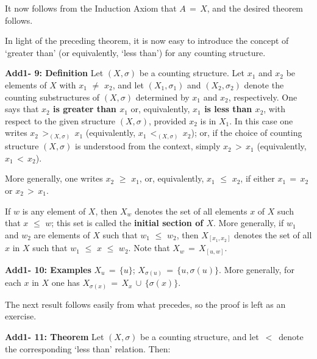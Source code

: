         It now follows from the Induction Axiom that $A \,=\, X$, and the desired theorem follows.

\V
\V

        In light of the preceding theorem, it is now easy to introduce the concept of `greater than' (or equivalently, `less than') for any counting structure.

\V

        {\bf Add1- 9: Definition} Let $(X,{\sigma})$ be a counting structure. Let $x_{1}$ and $x_{2}$ be elements of $X$ with $x_{1} \,\,{\neq}\,\, x_{2}$,
    and let $(X_{1},{\sigma}_{1})$ and $(X_{2},{\sigma}_{2})$ denote the counting substructures of $(X,{\sigma})$ determined by $x_{1}$ and $x_{2}$, respectively.
    One says that {\bf $x_{2}$ is greater than $x_{1}$} or, equivalently, {\bf $x_{1}$ is less than $x_{2}$}, with respect to the given structure $(X,{\sigma})$, provided $x_{2}$ is in $X_{1}$.
    In this case one writes $x_{2}\,>_{(X,{\sigma})}\,x_{1}$ (equivalently, $x_{1}\,<_{(X,{\sigma})}\,x_{2}$);
    or, if the choice of counting structure $(X,{\sigma})$ is understood from the context, simply $x_{2}\,>\,x_{1}$ (equivalently, $x_{1}\,<\,x_{2}$).

        More generally, one writes $x_{2}\,\,{\geq}\,\,x_{1}$, or, equivalently, $x_{1}\,\,{\leq}\,\,x_{2}$, if either $x_{1} \,=\, x_{2}$ or $x_{2}\,>\,x_{1}$.

        If $w$ is any element of $X$, then $X_{w}$ denotes the set of all elements $x$ of $X$ such that $x\,\,{\leq}\,\,w$;
    this set is called the {\bf initial section of $X$}.
    More generally, if $w_{1}$ and $w_{2}$ are elements of $X$ such that $w_{1}\,\,{\leq}\,\,w_{2}$,
    then $X_{[x_{1},x_{2}]}$ denotes the set of all $x$ in $X$ such that $w_{1}\,\,{\leq}\,\,x\,\,{\leq}\,\,w_{2}$.
    Note that $X_{w} \,=\, X_{[u,w]}$.

\V

        {\bf Add1- 10: Examples} $X_{u} \,=\, \{u\}$; $X_{{\sigma}(u)} \,=\, \{u,{\sigma}(u)\}$.
    More generally, for each $x$ in $X$ one has $X_{{\sigma}(x)} \,=\, X_{x}\,{\cup}\,\{{\sigma}(x)\}$.

\V

        The next result follows easily from what precedes, so the proof is left as an exercise.

\V

        {\bf Add1- 11: Theorem} Let $(X,{\sigma})$ be a counting structure, and let $\,<\,$ denote the corresponding `less than' relation.
    Then:

